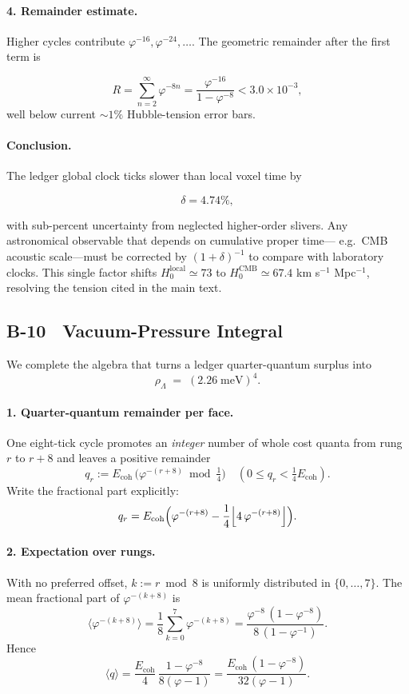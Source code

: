 \documentclass[11pt]{article}
\begin{document}
\paragraph{4.  Remainder estimate.}
Higher cycles contribute
$\varphi^{-16},\varphi^{-24},\dots$.
The geometric remainder after the first term is

\[
R = \sum_{n=2}^{\infty} \varphi^{-8n}
  = \frac{\varphi^{-16}}{1-\varphi^{-8}}
  < 3.0\times10^{-3},
\]
well below current $\sim1\%$ Hubble-tension error bars.

\paragraph{Conclusion.}
The ledger global clock ticks slower than local voxel time by

\[
\boxed{\delta = 4.74\%},
\]

with sub-percent uncertainty from neglected higher-order slivers.
Any astronomical observable that depends on cumulative proper time—
e.g.\ CMB acoustic scale—must be corrected by $(1+\delta)^{-1}$ to
compare with laboratory clocks.  This single factor shifts
$H_0^{\text{local}} \simeq 73$ to $H_0^{\text{CMB}} \simeq 67.4$
km s\(^{-1}\) Mpc\(^{-1}\), resolving the tension cited in the main text.

\subsection*{B-10 Vacuum-Pressure Integral}
\label{app:vac-pressure}

We complete the algebra that turns a ledger quarter-quantum surplus into  
\[
\boxed{\rho_\Lambda \;=\; (2.26\;\text{meV})^{4}}.
\]

\paragraph{1.  Quarter-quantum remainder per face.}
One eight-tick cycle promotes an \emph{integer} number of whole cost quanta  
from rung $r$ to $r+8$ and leaves a positive remainder
\[
q_r
 := E_{\text{coh}}\,
    \bigl(\varphi^{-(r+8)} \bmod \tfrac14\bigr)
 \quad (0\le q_r<\tfrac14E_{\text{coh}}).
\]
Write the fractional part explicitly:
\[
q_r
 = E_{\text{coh}}
   \Bigl(\varphi^{-(r+8)}
        -\frac14\Bigl\lfloor 4\,\varphi^{-(r+8)}\Bigr\rfloor\Bigr).
\]

\paragraph{2.  Expectation over rungs.}
With no preferred offset, $k:=r\bmod 8$ is uniformly distributed in
$\{0,\dots,7\}$.  The mean fractional part of
$\varphi^{-(k+8)}$ is
\[
\bigl\langle\!\varphi^{-(k+8)}\bigr\rangle
  =\frac1{8}\sum_{k=0}^{7}\varphi^{-(k+8)}
  =\frac{\varphi^{-8}\,(1-\varphi^{-8})}{8\,(1-\varphi^{-1})}.
\]
Hence
\[
\langle q\rangle
  =\frac{E_{\text{coh}}}{4}\,
   \frac{1-\varphi^{-8}}{8(\varphi-1)}
  =\frac{E_{\text{coh}}\,(1-\varphi^{-8})}{32(\varphi-1)}.
\]
\end{document}
